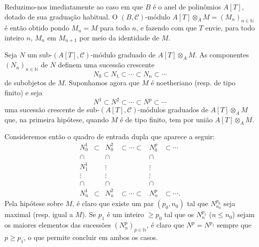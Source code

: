 \begin{prooftext}
Reduzimo-nos imediatamente ao caso em que \(B\) é o anel de polinômios \(A[T]\), dotado de sua graduação habitual. O \((B,\mathcal C)\)-módulo \(A[T]\otimes_A M=(M_n)_{n\in\mathbb N}\) é então obtido pondo \(M_n=M\) para todo \(n\), e fazendo com que \(T\) envie, para todo inteiro \(n\), \(M_n\) em \(M_{n+1}\) por meio da identidade de \(M\).

Seja \(N\) um sub-\((A[T],\mathcal C)\)-módulo graduado de \(A[T]\otimes_A M\). As componentes \((N_n)_{n\in\mathbb N}\) de \(N\) definem uma sucessão crescente
\[
N_0\subset N_1\subset\cdots\subset N_n\subset\cdots
\]
de subobjetos de \(M\). Suponhamos agora que \(M\) é noetheriano (resp. de tipo finito) e seja
\[
N^1\subset N^2\subset\cdots\subset N^p\subset\cdots
\]
uma sucessão crescente de sub-\((A[T],\mathcal C)\)-módulos graduados de \(A[T]\otimes_A M\) que, na primeira hipótese, quando \(M\) é de tipo finito, tem por união \(A[T]\otimes_A M\).

Consideremos então o quadro de entrada dupla que aparece a seguir:
\[
\begin{array}{cccccc}
N_0^1&\subset&N_0^2&\subset\cdots\subset&N_0^p&\subset\cdots\\
\cap&&\cap&&\cap\\
N_1^1&&\vdots&&\vdots\\
\vdots&&\vdots&&\vdots\\
\cap&&\cap&&\cap\\
N_n^1&\subset&N_n^2&\subset\cdots\subset&N_n^p&\subset\cdots .
\end{array}
\]
Pela hipótese sobre \(M\), é claro que existe um par \((p_0,n_0)\) tal que \(N^{p_0}_{n_0}\) seja maximal (resp. igual a \(M\)). Se \(p_1\) é um inteiro \(\ge p_0\) tal que os \(N_n^{p_1}\) (\(n\le n_0\)) sejam os maiores elementos das sucessões \((N_n^p)_{p\in\mathbb N}\), é claro que \(N^p=N^{p_1}\) sempre que \(p\ge p_1\), o que permite concluir em ambos os casos.
\end{prooftext}
